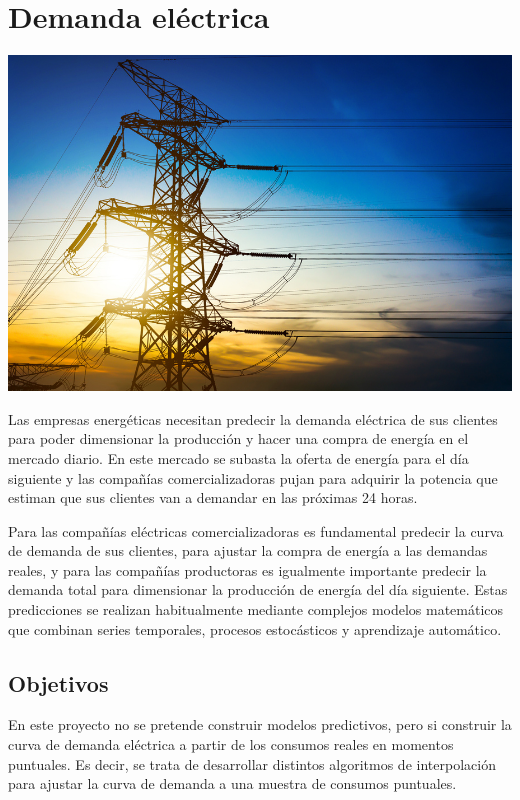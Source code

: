 \documentclass[
  a4paper,
]{scrreport}
\begin{document}

\hypertarget{demanda-eluxe9ctrica}{%
\chapter{Demanda eléctrica}\label{demanda-eluxe9ctrica}}

\includegraphics{./img/demanda-electrica/torre-electrica.jpg}

Las empresas energéticas necesitan predecir la demanda eléctrica de sus
clientes para poder dimensionar la producción y hacer una compra de
energía en el mercado diario. En este mercado se subasta la oferta de
energía para el día siguiente y las compañías comercializadoras pujan
para adquirir la potencia que estiman que sus clientes van a demandar en
las próximas 24 horas.

Para las compañías eléctricas comercializadoras es fundamental predecir
la curva de demanda de sus clientes, para ajustar la compra de energía a
las demandas reales, y para las compañías productoras es igualmente
importante predecir la demanda total para dimensionar la producción de
energía del día siguiente. Estas predicciones se realizan habitualmente
mediante complejos modelos matemáticos que combinan series temporales,
procesos estocásticos y aprendizaje automático.

\hypertarget{objetivos}{%
\section{Objetivos}\label{objetivos}}

En este proyecto no se pretende construir modelos predictivos, pero si
construir la curva de demanda eléctrica a partir de los consumos reales
en momentos puntuales. Es decir, se trata de desarrollar distintos
algoritmos de interpolación para ajustar la curva de demanda a una
muestra de consumos puntuales.
\end{document}
